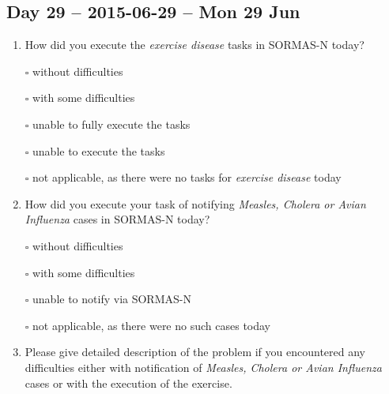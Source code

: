 \documentclass[a4paper, titlepage]{tufte-handout}
\begin{document}
\subsection{Day 29 -- 2015-06-29 -- Mon 29 Jun}
\label{sec-8-21}
\begin{enumerate}
\item How did you execute the \emph{exercise disease} tasks in SORMAS-N today?

\quad $\square$ without difficulties

\quad $\square$ with some difficulties

\quad $\square$ unable to fully execute the tasks

\quad $\square$ unable to execute the tasks

\quad $\square$ not applicable, as there were no tasks for \emph{exercise disease} today

\item How did you execute your task of notifying \emph{Measles, Cholera or Avian Influenza} cases in SORMAS-N today?

\quad $\square$ without difficulties

\quad $\square$ with some difficulties

\quad $\square$ unable to notify via SORMAS-N

\quad $\square$ not applicable, as there were no such cases today

\item Please give detailed description of the problem if you encountered any difficulties either with notification of \emph{Measles, Cholera or Avian Influenza} cases or with the execution of the exercise.

\hrulefill

\hrulefill

\hrulefill

\hrulefill

\hrulefill

\hrulefill

\hrulefill

\hrulefill

\hrulefill

\hrulefill
\end{enumerate}

\newpage
\end{document}
